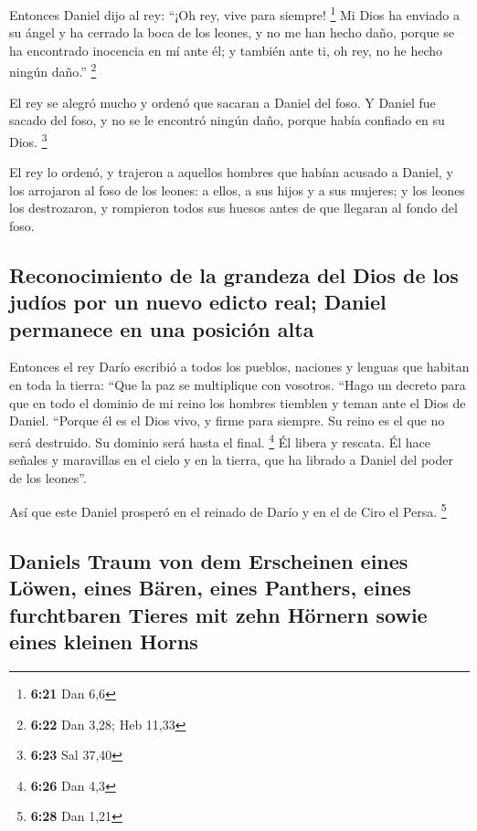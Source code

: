  Entonces Daniel dijo al rey: ``¡Oh rey, vive para
siempre! \footnote{\textbf{6:21} Dan 6,6}  Mi Dios ha
enviado a su ángel y ha cerrado la boca de los leones, y no me han hecho
daño, porque se ha encontrado inocencia en mí ante él; y también ante
ti, oh rey, no he hecho ningún daño.'' \footnote{\textbf{6:22} Dan 3,28;
  Heb 11,33}

 El rey se alegró mucho y ordenó que sacaran a Daniel del
foso. Y Daniel fue sacado del foso, y no se le encontró ningún daño,
porque había confiado en su Dios. \footnote{\textbf{6:23} Sal 37,40}

 El rey lo ordenó, y trajeron a aquellos hombres que
habían acusado a Daniel, y los arrojaron al foso de los leones: a ellos,
a sus hijos y a sus mujeres; y los leones los destrozaron, y rompieron
todos sus huesos antes de que llegaran al fondo del foso.

\hypertarget{reconocimiento-de-la-grandeza-del-dios-de-los-juduxedos-por-un-nuevo-edicto-real-daniel-permanece-en-una-posiciuxf3n-alta}{%
\subsection{Reconocimiento de la grandeza del Dios de los judíos por un
nuevo edicto real; Daniel permanece en una posición
alta}\label{reconocimiento-de-la-grandeza-del-dios-de-los-juduxedos-por-un-nuevo-edicto-real-daniel-permanece-en-una-posiciuxf3n-alta}}

 Entonces el rey Darío escribió a todos los pueblos,
naciones y lenguas que habitan en toda la tierra: ``Que la paz se
multiplique con vosotros.  ``Hago un decreto para que en
todo el dominio de mi reino los hombres tiemblen y teman ante el Dios de
Daniel. ``Porque él es el Dios vivo, y firme para siempre. Su reino es
el que no será destruido. Su dominio será hasta el final. \footnote{\textbf{6:26}
  Dan 4,3}  Él libera y rescata. Él hace señales y
maravillas en el cielo y en la tierra, que ha librado a Daniel del poder
de los leones''.

 Así que este Daniel prosperó en el reinado de Darío y en
el de Ciro el Persa. \footnote{\textbf{6:28} Dan 1,21}

\hypertarget{daniels-traum-von-dem-erscheinen-eines-luxf6wen-eines-buxe4ren-eines-panthers-eines-furchtbaren-tieres-mit-zehn-huxf6rnern-sowie-eines-kleinen-horns}{%
\subsection{Daniels Traum von dem Erscheinen eines Löwen, eines Bären,
eines Panthers, eines furchtbaren Tieres mit zehn Hörnern sowie eines
kleinen
Horns}\label{daniels-traum-von-dem-erscheinen-eines-luxf6wen-eines-buxe4ren-eines-panthers-eines-furchtbaren-tieres-mit-zehn-huxf6rnern-sowie-eines-kleinen-horns}}

